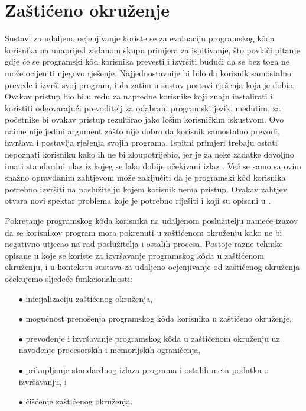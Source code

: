 \documentclass[times, utf8, diplomski]{fer}
\begin{document}
\section{Zaštićeno okruženje}
Sustavi za udaljeno ocjenjivanje koriste se za evaluaciju programskog kôda korisnika na unaprijed zadanom skupu primjera za ispitivanje, što povlači pitanje gdje će se programski kôd korisnika prevesti i izvršiti budući da se bez toga ne može ocijeniti njegovo rješenje. Najjednostavnije bi bilo da korisnik samostalno prevede i izvrši svoj program, i da zatim u sustav postavi rješenja koja je dobio. Ovakav pristup bio bi u redu za napredne korisnike koji znaju instalirati i koristiti odgovarajući prevoditelj za odabrani programski jezik, međutim, za početnike bi ovakav pristup rezultirao jako lošim korisničkim iskustvom. Ovo naime nije jedini argument zašto nije dobro da korisnik samostalno prevodi, izvršava i postavlja rješenja svojih programa. Ispitni primjeri trebaju ostati nepoznati korisniku kako ih ne bi zloupotrijebio, jer je za neke zadatke dovoljno imati standardni ulaz  iz kojeg se lako dobije očekivani izlaz . Već se samo sa ovim snažno opravdanim zahtjevom može zaključiti da je programski kôd korisnika potrebno izvršiti na poslužitelju kojem korisnik nema pristup. Ovakav zahtjev otvara novi spektar problema koje je potrebno riješiti i koji su opisani u \citep{kurnia2001online}.

Pokretanje programskog kôda korisnika na udaljenom poslužitelju nameće izazov da se korisnikov program mora pokrenuti u zaštićenom okruženju kako ne bi negativno utjecao na rad poslužitelja i ostalih procesa. Postoje razne tehnike opisane u \citep{yi2014comparison} koje se koriste za izvršavanje programskog kôda u zaštićenom okruženju, i u kontekstu sustava za udaljeno ocjenjivanje od zaštićenog okruženja očekujemo sljedeće funkcionalnosti:
\begin{itemize}
    \item[$\bullet$] inicijalizaciju zaštićenog okruženja,
    \item[$\bullet$] mogućnost prenošenja programskog kôda korisnika u zaštićeno okruženje,
    \item[$\bullet$] prevođenje i izvršavanje programskog kôda u zaštićenom okruženju uz navođenje procesorskih i memorijskih ograničenja,
    \item[$\bullet$] prikupljanje standardnog izlaza  programa i ostalih meta podatka o izvršavanju, i
    \item[$\bullet$] čišćenje  zaštićenog okruženja.
\end{itemize}
\end{document}
